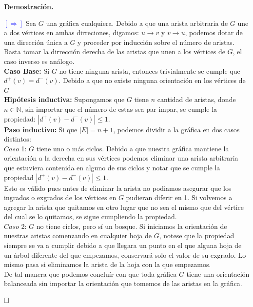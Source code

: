 \documentclass[12pt]{article}
\begin{document}
\textbf{Demostración.}

\textcolor{blue}{$[\Rightarrow]$} Sea $G$ una gráfica cualquiera. Debido a que una arista arbitraria de $G$ une a dos 
vértices en ambas dirreciones, digamos: $u \rightarrow v$ y $v \rightarrow u$, podemos dotar de una dirección única a 
$G$ y proceder por inducción sobre el número de aristas. Basta tomar la dirrección derecha de las aristas que unen a 
los vértices de $G$, el caso inverso es análogo.\\

\textbf{Caso Base:} Si $G$ no tiene ninguna arista, entonces trivialmente se cumple que $d^+(v) = d^-(v)$. 
Debido a que no existe ninguna orientación en los vértices de $G$ \\

\textbf{Hipótesis inductiva:} Supongamos que $G$ tiene $n$ cantidad de aristas, donde 
$n \in \mathbb{N}$, sin importar que el número de estas sea par impar, se cumple la propiedad: $|d^+(v)-d^-(v)| \leq 1$.\\

\textbf{Paso inductivo:} Si que $|E| = n + 1$, podemos dividir a la gráfica en dos casos distintos:\\

$Caso$ 1: $G$ tiene uno o más ciclos. Debido a que nuestra gráfica mantiene la orientación a la derecha en sus vértices 
podemos eliminar una arista arbitraria que estuviera contenida en alguno de sus ciclos y notar que se cumple la propiedad 
$|d^+(v)-d^-(v)| \leq 1$.\\

Esto es válido pues antes de eliminar la arista no podiamos asegurar que los ingrados o exgrados 
de los vértices en $G$ pudieran diferir en 1. Si volvemos a agregar la arista que quitamos en otro lugar que no sea el mismo 
que del vértice del cual se lo quitamos, se sigue cumpliendo la propiedad.\\

$Caso$ 2: $G$ no tiene ciclos, pero sí un bosque. Si iniciamos la orientación de nuestras aristas comenzando en cualquier 
hoja de $G$, notese que la propiedad siempre se va a cumplir debido a que llegara un punto en el que alguna hoja de un árbol 
diferente del que empezamos, conservará solo el valor de su exgrado. Lo mismo pasa si eliminamos la arista de la hoja 
con la que empezamos.\\

De tal manera que podemos concluír con que toda gráfica $G$ tiene una orientación balanceada sin importar la orientación 
que tomemos de las aristas en la gráfica.

$\hfill\square$
\end{document}
